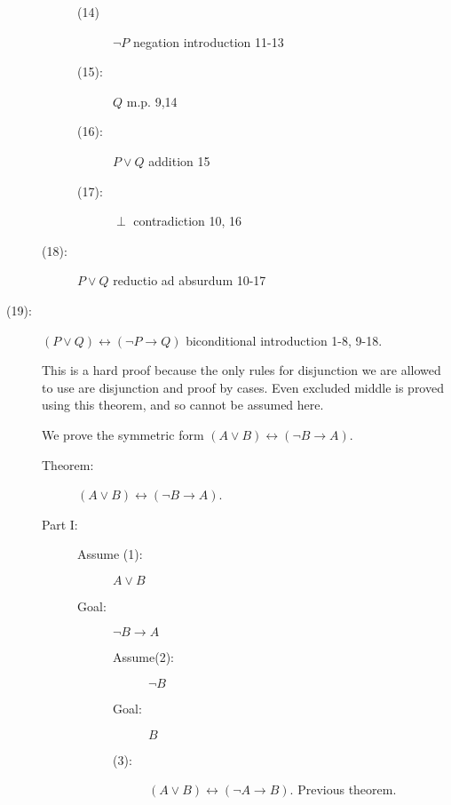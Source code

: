\documentclass[12pt]{book}
\begin{document}
\begin{description}
\begin{description}
\begin{description}
\begin{description}
\end{description}

\item[(14)]  $\neg P$ negation introduction 11-13

\item[(15):]  $Q$ m.p. 9,14

\item[(16):]  $P \vee Q$ addition 15

\item[(17):]  $\perp$ contradiction 10, 16

\end{description}

\item[(18):]  $P \vee Q$ reductio ad absurdum 10-17
\end{description}

\item[(19):]  $(P \vee Q) \leftrightarrow (\neg P \rightarrow Q)$ biconditional introduction 1-8, 9-18.

This is a hard proof because the only rules for disjunction we are allowed to use are disjunction and proof by cases.  Even excluded middle is proved using this theorem, and so cannot be assumed here.

\newpage

We prove the symmetric form $(A \vee B) \leftrightarrow (\neg B \rightarrow A)$.

\begin{description}

\item[Theorem:]  $(A \vee B) \leftrightarrow (\neg B \rightarrow A)$.

\item[Part I:]

\begin{description}


\item[Assume (1):]  $A \vee B$

\item[Goal:]  $\neg B \rightarrow A$

\begin{description}

\item[Assume(2):]  $\neg B$

\item[Goal:]  $B$

\item[(3):]  $(A \vee B) \leftrightarrow (\neg A \rightarrow B)$.  Previous theorem.


\end{description}
\end{description}
\end{description}
\end{description}
\end{document}
